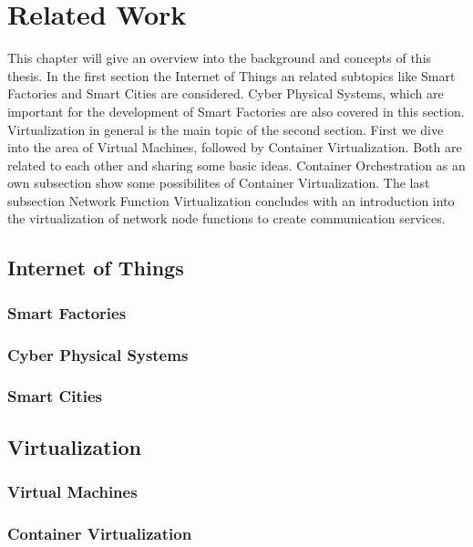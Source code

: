 \chapter{Related Work}
This chapter will give an overview into the background and concepts of this thesis.
In the first section the Internet of Things an related subtopics like Smart Factories and Smart Cities are considered.
Cyber Physical Systems, which are important for the development of Smart Factories are also covered in this section.
Virtualization in general is the main topic of the second section.
First we dive into the area of Virtual Machines, followed by Container Virtualization.
Both are related to each other and sharing some basic ideas.
Container Orchestration as an own subsection show some possibilites of Container Virtualization.
The last subsection Network Function Virtualization concludes with an introduction into the virtualization of network node functions to create communication services.


\section{Internet of Things}


\subsection{Smart Factories}


\subsection{Cyber Physical Systems}


\subsection{Smart Cities}


\section{Virtualization}


\subsection{Virtual Machines}


\subsection{Container Virtualization}


